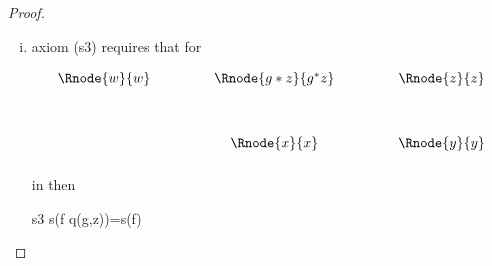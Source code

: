 \begin{proof}
\begin{enumerate}[(i)]
\item 
axiom (s3) requires that for

\begin{center}
\begin{displaymath}
\begin{array}{c p{.9cm} c p{.9cm} c}
\Rnode{w}{w}&& \Rnode{g*z}{g \sub z} && \Rnode{z}{z} \\ [1.2cm]
            && \Rnode{x}{x}  && \Rnode{y}{y} \\ [0.2cm]
\end{array}
\end{displaymath}
\end{center}

\noindent in  then

\begin{axiom}{s3}
s(f \circ q(g,z))=s(f)
\end{axiom}

\end{enumerate}
\end{proof}





